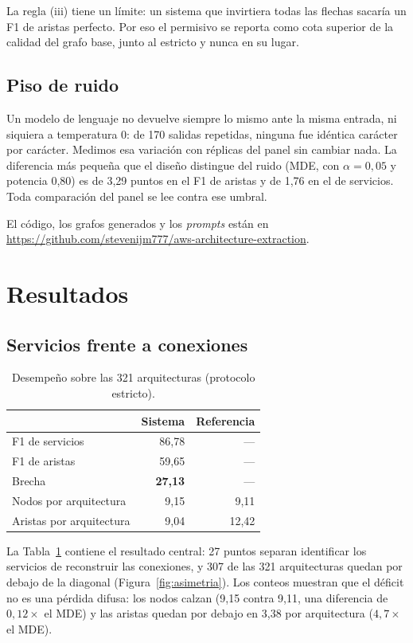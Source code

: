 \documentclass[a4paper, twocolumn, 10pt]{IEEEtran}
\begin{document}
La regla (iii) tiene un límite: un sistema que invirtiera todas las flechas sacaría
un F1 de aristas perfecto. Por eso el permisivo se reporta como cota superior de la
calidad del grafo base, junto al estricto y nunca en su lugar.

\subsection{Piso de ruido}
\label{sec:piso}

Un modelo de lenguaje no devuelve siempre lo mismo ante la misma entrada, ni
siquiera a temperatura 0: de 170 salidas repetidas, ninguna fue idéntica carácter
por carácter. Medimos esa variación con réplicas del panel sin cambiar nada. La
diferencia más pequeña que el diseño distingue del ruido (MDE, con
$\alpha=0{,}05$ y potencia 0,80) es de 3,29 puntos en el F1 de aristas y de 1,76 en
el de servicios. Toda comparación del panel se lee contra ese umbral.

El código, los grafos generados y los \emph{prompts} están en
\url{https://github.com/stevenijm777/aws-architecture-extraction}.

\section{Resultados}

\subsection{Servicios frente a conexiones}
\label{sec:rq1}

\begin{table}[H]
\centering\small
\caption{Desempeño sobre las 321 arquitecturas (protocolo estricto).}
\label{tab:rq1}
\begin{tabular}{lrr}
\toprule
 & Sistema & Referencia\\
\midrule
F1 de servicios        & 86,78 & ---\\
F1 de aristas          & 59,65 & ---\\
Brecha                 & \textbf{27,13} & ---\\
\midrule
Nodos por arquitectura   & 9,15 & 9,11\\
Aristas por arquitectura & 9,04 & 12,42\\
\bottomrule
\end{tabular}
\end{table}

La Tabla~\ref{tab:rq1} contiene el resultado central: 27 puntos separan
identificar los servicios de reconstruir las conexiones, y 307 de las 321
arquitecturas quedan por debajo de la diagonal (Figura~\ref{fig:asimetria}). Los
conteos muestran que el déficit no es una pérdida difusa: los nodos calzan (9,15
contra 9,11, una diferencia de $0{,}12\times$ el MDE) y las aristas quedan por
debajo en 3,38 por arquitectura ($4{,}7\times$ el MDE).
\end{document}
